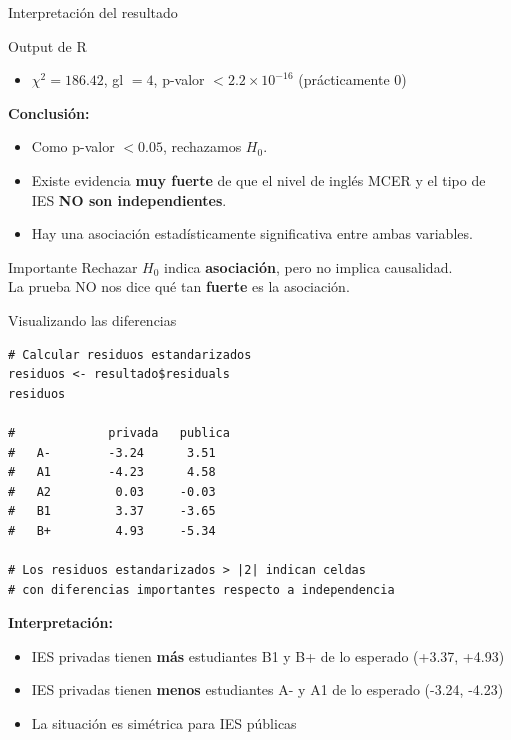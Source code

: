 \documentclass[aspectratio=169, 11pt]{beamer}
\begin{document}
\begin{frame}{Interpretación del resultado}
\begin{block}{Output de R}
\begin{itemize}
  \item $\chi^2 = 186.42$, gl $= 4$, p-valor $< 2.2 \times 10^{-16}$ (prácticamente 0)
\end{itemize}
\end{block}

\vspace{0.15cm}
\textbf{Conclusión:}
\begin{itemize}
  \item Como p-valor $< 0.05$, rechazamos $H_0$.
  \item Existe evidencia \textbf{muy fuerte} de que el nivel de inglés MCER y el tipo de IES \textbf{NO son independientes}.
  \item Hay una asociación estadísticamente significativa entre ambas variables.
\end{itemize}

\vspace{0.15cm}
\begin{alertblock}{Importante}
Rechazar $H_0$ indica \textbf{asociación}, pero no implica causalidad.\\
La prueba NO nos dice qué tan \textbf{fuerte} es la asociación.
\end{alertblock}
\end{frame}

\begin{frame}[fragile]{Visualizando las diferencias}
\begin{lstlisting}
# Calcular residuos estandarizados
residuos <- resultado$residuals
residuos

#             privada   publica
#   A-        -3.24      3.51
#   A1        -4.23      4.58
#   A2         0.03     -0.03
#   B1         3.37     -3.65
#   B+         4.93     -5.34

# Los residuos estandarizados > |2| indican celdas
# con diferencias importantes respecto a independencia
\end{lstlisting}

\vspace{0.2cm}
\textbf{Interpretación:}
\begin{itemize}
  \item IES privadas tienen \textbf{más} estudiantes B1 y B+ de lo esperado (+3.37, +4.93)
  \item IES privadas tienen \textbf{menos} estudiantes A- y A1 de lo esperado (-3.24, -4.23)
  \item La situación es simétrica para IES públicas
\end{itemize}
\end{frame}
\end{document}
